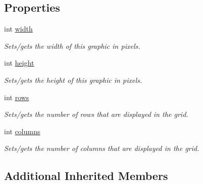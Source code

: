 \subsection*{Properties}
\begin{DoxyCompactItemize}
\item 
\hypertarget{class_picto_1_1_grid_graphic_a4cfbc6f2fdbcd6be771f2e204a282856}{int \hyperlink{class_picto_1_1_grid_graphic_a4cfbc6f2fdbcd6be771f2e204a282856}{width}}\label{class_picto_1_1_grid_graphic_a4cfbc6f2fdbcd6be771f2e204a282856}

\begin{DoxyCompactList}\small\item\em Sets/gets the width of this graphic in pixels. \end{DoxyCompactList}\item 
\hypertarget{class_picto_1_1_grid_graphic_a6fca5768a88151f87d7a8e9bef9b2855}{int \hyperlink{class_picto_1_1_grid_graphic_a6fca5768a88151f87d7a8e9bef9b2855}{height}}\label{class_picto_1_1_grid_graphic_a6fca5768a88151f87d7a8e9bef9b2855}

\begin{DoxyCompactList}\small\item\em Sets/gets the height of this graphic in pixels. \end{DoxyCompactList}\item 
\hypertarget{class_picto_1_1_grid_graphic_a5463dd6c91c11876e2824672e0fbe8f2}{int \hyperlink{class_picto_1_1_grid_graphic_a5463dd6c91c11876e2824672e0fbe8f2}{rows}}\label{class_picto_1_1_grid_graphic_a5463dd6c91c11876e2824672e0fbe8f2}

\begin{DoxyCompactList}\small\item\em Sets/gets the number of rows that are displayed in the grid. \end{DoxyCompactList}\item 
\hypertarget{class_picto_1_1_grid_graphic_ab4519f754954e50d06711fbc2ba4608f}{int \hyperlink{class_picto_1_1_grid_graphic_ab4519f754954e50d06711fbc2ba4608f}{columns}}\label{class_picto_1_1_grid_graphic_ab4519f754954e50d06711fbc2ba4608f}

\begin{DoxyCompactList}\small\item\em Sets/gets the number of columns that are displayed in the grid. \end{DoxyCompactList}\end{DoxyCompactItemize}
\subsection*{Additional Inherited Members}


